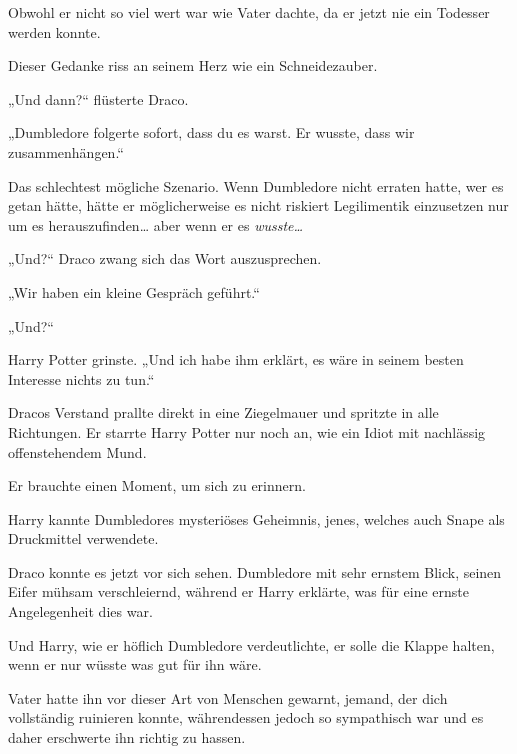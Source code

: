 {Obwohl er nicht so viel wert war wie Vater dachte, da er jetzt nie ein Todesser werden konnte.

Dieser Gedanke riss an seinem Herz wie ein Schneidezauber.

„Und dann?“ flüsterte Draco.

„Dumbledore folgerte sofort, dass du es warst. Er wusste, dass wir zusammenhängen.“

Das schlechtest mögliche Szenario. Wenn Dumbledore nicht erraten hatte, wer es getan hätte, hätte er möglicherweise es nicht riskiert Legilimentik einzusetzen nur um es herauszufinden… aber wenn er es \emph{wusste…}

„Und?“ Draco zwang sich das Wort auszusprechen.

„Wir haben ein kleine Gespräch geführt.“

„Und?“

Harry Potter grinste. „Und ich habe ihm erklärt, es wäre in seinem besten Interesse nichts zu tun.“

Dracos Verstand prallte direkt in eine Ziegelmauer und spritzte in alle Richtungen. Er starrte Harry Potter nur noch an, wie ein Idiot mit nachlässig offenstehendem Mund.

Er brauchte einen Moment, um sich zu erinnern.

Harry kannte Dumbledores mysteriöses Geheimnis, jenes, welches auch Snape als Druckmittel verwendete.

Draco konnte es jetzt vor sich sehen. Dumbledore mit sehr ernstem Blick, seinen Eifer mühsam verschleiernd, während er Harry erklärte, was für eine ernste Angelegenheit dies war.

Und Harry, wie er höflich Dumbledore verdeutlichte, er solle die Klappe halten, wenn er nur wüsste was gut für ihn wäre.

Vater hatte ihn vor dieser Art von Menschen gewarnt, jemand, der dich vollständig ruinieren konnte, währendessen jedoch so sympathisch war und es daher erschwerte ihn richtig zu hassen.

}
